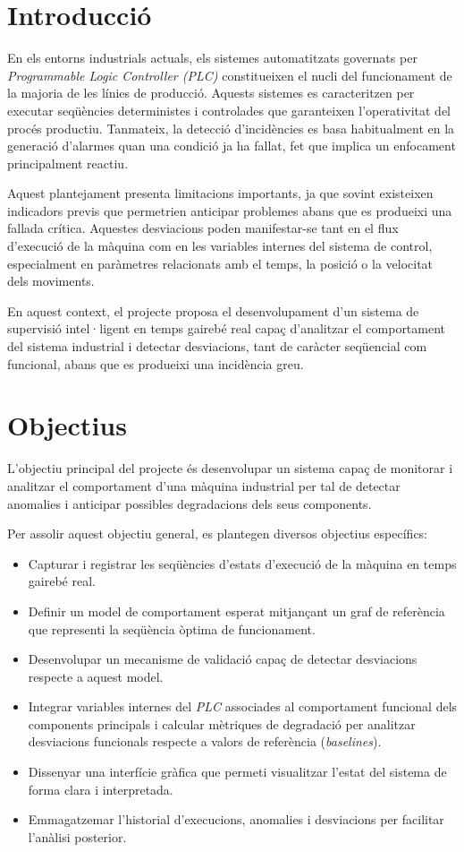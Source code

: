 
\section*{Introducció}
En els entorns industrials actuals, els sistemes automatitzats governats per \textit{Programmable Logic Controller (PLC)} constitueixen el nucli del funcionament de la majoria de les línies de producció. Aquests sistemes es caracteritzen per executar seqüències deterministes i controlades que garanteixen l’operativitat del procés productiu. Tanmateix, la detecció d’incidències es basa habitualment en la generació d’alarmes quan una condició ja ha fallat, fet que implica un enfocament principalment reactiu.

Aquest plantejament presenta limitacions importants, ja que sovint existeixen indicadors previs que permetrien anticipar problemes abans que es produeixi una fallada crítica. Aquestes desviacions poden manifestar-se tant en el flux d’execució de la màquina com en les variables internes del sistema de control, especialment en paràmetres relacionats amb el temps, la posició o la velocitat dels moviments.

En aquest context, el projecte proposa el desenvolupament d’un sistema de supervisió intel·ligent en temps gairebé real capaç d’analitzar el comportament del sistema industrial i detectar desviacions, tant de caràcter seqüencial com funcional, abans que es produeixi una incidència greu.

\section*{Objectius}
L’objectiu principal del projecte és desenvolupar un sistema capaç de monitorar i analitzar el comportament d’una màquina industrial per tal de detectar anomalies i anticipar possibles degradacions dels seus components.

Per assolir aquest objectiu general, es plantegen diversos objectius específics:
\begin{itemize}
    \item Capturar i registrar les seqüències d’estats d’execució de la màquina en temps gairebé real.
    \item Definir un model de comportament esperat mitjançant un graf de referència que representi la seqüència òptima de funcionament.
    \item Desenvolupar un mecanisme de validació capaç de detectar desviacions respecte a aquest model.
    \item Integrar variables internes del \textit{PLC} associades al comportament funcional dels components principals i calcular mètriques de degradació per analitzar desviacions funcionals respecte a valors de referència (\textit{baselines}).
    \item Dissenyar una interfície gràfica que permeti visualitzar l’estat del sistema de forma clara i interpretada.
    \item Emmagatzemar l’historial d’execucions, anomalies i desviacions per facilitar l’anàlisi posterior.
\end{itemize}


